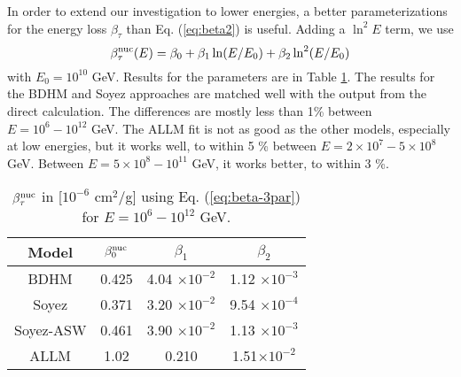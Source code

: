 \documentclass[aps,10pt,twocolumn,tightenlines]{revtex4-1}
\begin{document}
\begin{appendix}
In order to extend our investigation to lower energies, a better parameterizations for the energy loss $\beta_\tau$
than Eq. (\ref{eq:beta2})
is useful. Adding a $\ln^2 E$ term, we use
\begin{equation}
\label{eq:beta-3par}
\beta_\tau ^{\rm nuc} (E) = \beta_0 + \beta_1\ln(E/E_0) + \beta_2\ln^2(E/E_0) 
\end{equation}
with $E_0=10^{10}$ GeV. Results for the parameters are in Table \ref{table:beta-3par}.
The results for the BDHM and Soyez approaches
are matched well with the output from the direct calculation. 
The differences are mostly less than 1\% between $ E= 10^6  - 10^{12}$ GeV.
The ALLM fit is not as good as the other models, especially at low energies, 
but it works well, to within 5 \% between  $E = 2  \times 10^7  - 5\times 10^8$ GeV.
Between $E = 5  \times 10^8  - 10^{11}$ GeV, it works better, to  within 3 \%.

\begin{table}[h]
\caption{$\beta_\tau^{\rm nuc}$ in [$10^{-6}$ cm$^2$/g] using Eq. (\ref{eq:beta-3par}) for
$E=10^6-10^{12}$ GeV.}
\begin{center}
\begin{tabular}{|c|c|c|c|}
\hline
Model & $\beta_0^{\rm nuc}$ & $\beta_1$ & $\beta_2$\\
\hline 
\hline 
BDHM & 0.425 & 4.04 $\times 10^{-2}$ & 1.12 $\times 10^{-3}$\\
\hline 
Soyez& 0.371 & 3.20 $\times 10^{-2}$ &9.54 $\times 10^{-4}$\\
\hline 
Soyez-ASW & 0.461 & 3.90 $\times 10^{-2}$ & 1.13 $\times 10^{-3}$\\
\hline 
ALLM & 1.02 & 0.210 & 1.51$\times 10^{-2}$\\
\hline
\end{tabular}
\end{center}
\label{table:beta-3par}
\end{table}%



\end{appendix}
\end{document}
